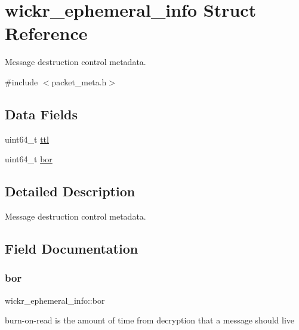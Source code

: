 \hypertarget{structwickr__ephemeral__info}{}\section{wickr\+\_\+ephemeral\+\_\+info Struct Reference}
\label{structwickr__ephemeral__info}


Message destruction control metadata.  




{\ttfamily \#include $<$packet\+\_\+meta.\+h$>$}

\subsection*{Data Fields}
\begin{DoxyCompactItemize}
\item 
uint64\+\_\+t \mbox{\hyperlink{structwickr__ephemeral__info_ac7936b5b7b83dd24ab6b68e8dd2dd6ba}{ttl}}
\item 
uint64\+\_\+t \mbox{\hyperlink{structwickr__ephemeral__info_a0bfb5badb8bdcfac1ace1ef2026c86ac}{bor}}
\end{DoxyCompactItemize}


\subsection{Detailed Description}
Message destruction control metadata. 

\subsection{Field Documentation}
\mbox{\label{structwickr__ephemeral__info_a0bfb5badb8bdcfac1ace1ef2026c86ac}} 
\subsubsection{\texorpdfstring{bor}{bor}}
{\footnotesize\ttfamily wickr\+\_\+ephemeral\+\_\+info\+::bor}

burn-\/on-\/read is the amount of time from decryption that a message should live \mbox{\label{structwickr__ephemeral__info_ac7936b5b7b83dd24ab6b68e8dd2dd6ba}} 

